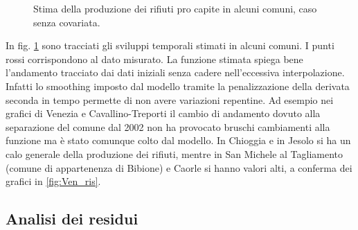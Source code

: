 \documentclass[a4paper,11pt,twoside,openright]{book}							%
\begin{document}
\begin{figure}[t]
{   }
	\caption{Stima della produzione dei rifiuti pro capite in alcuni comuni, caso senza covariata.}
	\label{fig:Ven_tempo}
\end{figure}

In fig. \ref{fig:Ven_tempo} sono tracciati gli sviluppi temporali stimati in alcuni comuni. I punti rossi corrispondono al dato misurato. La funzione stimata spiega bene l'andamento tracciato dai dati iniziali senza cadere nell'eccessiva interpolazione. Infatti lo smoothing imposto dal modello tramite la penalizzazione della derivata seconda in tempo permette di non avere variazioni repentine. Ad esempio nei grafici di Venezia e Cavallino-Treporti il cambio di andamento dovuto alla separazione del comune dal 2002 non ha provocato bruschi cambiamenti alla funzione ma è stato comunque colto dal modello. In Chioggia e in Jesolo si ha un calo generale della produzione dei rifiuti, mentre in San Michele al Tagliamento (comune di appartenenza di Bibione) e Caorle si hanno valori alti, a conferma dei grafici in \ref{fig:Ven_ris}.

\subsection{Analisi dei residui}
\end{document}
